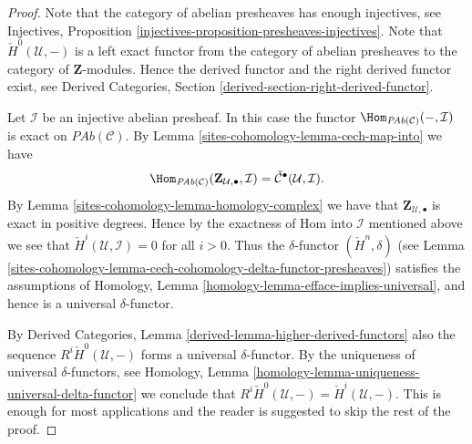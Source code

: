\begin{proof}
Note that the category of abelian presheaves has enough injectives, see
Injectives, Proposition \ref{injectives-proposition-presheaves-injectives}.
Note that $\check{H}^0(\mathcal{U}, -)$ is a left exact functor
from the category of abelian presheaves
to the category of $\mathbf{Z}$-modules.
Hence the derived functor and the right derived functor exist, see
Derived Categories, Section \ref{derived-section-right-derived-functor}.

\medskip\noindent
Let $\mathcal{I}$ be an injective abelian presheaf.
In this case the functor
$\Hom_{\textit{PAb}(\mathcal{C})}(-, \mathcal{I})$
is exact on $\textit{PAb}(\mathcal{C})$. By
Lemma \ref{sites-cohomology-lemma-cech-map-into} we have
$$
\Hom_{\textit{PAb}(\mathcal{C})}(
\mathbf{Z}_{\mathcal{U}, \bullet}, \mathcal{I})
=
\check{\mathcal{C}}^\bullet(\mathcal{U}, \mathcal{I}).
$$
By Lemma \ref{sites-cohomology-lemma-homology-complex} we have that
$\mathbf{Z}_{\mathcal{U}, \bullet}$ is exact in positive degrees.
Hence by the exactness of Hom into $\mathcal{I}$ mentioned above we see
that $\check{H}^i(\mathcal{U}, \mathcal{I}) = 0$ for all
$i > 0$. Thus the $\delta$-functor $(\check{H}^n, \delta)$
(see Lemma \ref{sites-cohomology-lemma-cech-cohomology-delta-functor-presheaves})
satisfies the assumptions of
Homology, Lemma \ref{homology-lemma-efface-implies-universal},
and hence is a universal $\delta$-functor.

\medskip\noindent
By
Derived Categories, Lemma \ref{derived-lemma-higher-derived-functors}
also the sequence $R^i\check{H}^0(\mathcal{U}, -)$
forms a universal $\delta$-functor. By the uniqueness of universal
$\delta$-functors, see
Homology, Lemma \ref{homology-lemma-uniqueness-universal-delta-functor}
we conclude that
$R^i\check{H}^0(\mathcal{U}, -) = \check{H}^i(\mathcal{U}, -)$.
This is enough for most applications
and the reader is suggested to skip the rest of the proof.


\end{proof}
